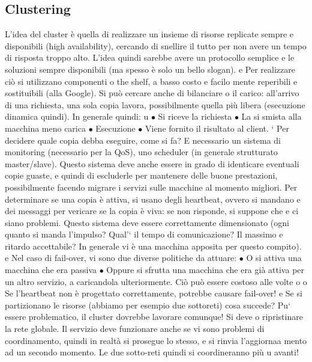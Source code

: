 \subsection{Clustering}
L'idea del cluster è quella di realizzare un insieme di risorse replicate sempre
e
disponibili (high availability), cercando di snellire il tutto per non avere un tempo di risposta troppo alto. L'idea
quindi sarebbe avere un protocollo semplice
e le soluzioni sempre disponibili (ma spesso è solo un bello slogan).
e
Per realizzare ciò si utilizzano componenti o the shelf, a basso costo e facilo
mente reperibili e sostituibili (alla Google). Si può cercare anche di bilanciare
o
il carico: all'arrivo di una richiesta, una sola copia lavora, possibilmente quella
più libera (esecuzione dinamica quindi). In generale quindi:
u
$\bullet$ Si riceve la richiesta
$\bullet$ La si smista alla macchina meno carica
$\bullet$ Esecuzione
$\bullet$ Viene fornito il risultato al client.
`
Per decidere quale copia debba eseguire, come si fa? E necessario un sistema
di monitoring (necessario per la QoS), uno scheduler (in generale strutturato
master/slave). Questo sistema deve anche essere in grado di identicare eventuali copie guaste, e quindi di escluderle
per mantenere delle buone prestazioni,
possibilmente facendo migrare i servizi sulle macchine al momento migliori. Per
determinare se una copia è attiva, si usano degli heartbeat, ovvero si mandano
e
dei messaggi per vericare se la copia è viva: se non risponde, si suppone che
e
ci siano problemi. Questo sistema deve essere correttamente dimensionato (ogni quanto si manda l'impulso? Qual'` il
tempo di comunicazione? Il massimo
e
ritardo accettabile? In generale vi è una macchina apposita per questo compito).
e
Nel caso di fail-over, vi sono due diverse politiche da attuare:
$\bullet$ O si attiva una macchina che era passiva
$\bullet$ Oppure si sfrutta una macchina che era già attiva per un altro servizio,
a
caricandola ulteriormente. Ciò può essere costoso alle volte
o o
Se l'heartbeat non è progettato correttamente, potrebbe causare fail-over!
e
Se si partizionano le risorse (abbiamo per esempio due sottoreti) cosa succede? Pu` essere problematico, il cluster
dovrebbe lavorare comunque! Si deve
o
ripristinare la rete globale. Il servizio deve funzionare anche se vi sono problemi
di coordinamento, quindi in realtà si prosegue lo stesso, e si rinvia l'aggiornaa
mento ad un secondo momento. Le due sotto-reti quindi si coordineranno più
u
avanti!
